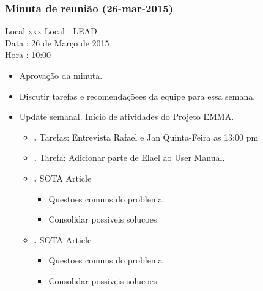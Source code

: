 \subsubsection{Minuta de reunião (26-mar-2015)}

\begin{tabbing}
  Local \= xxx \kill
  Local \> : LEAD \\
  Data  \> : 26 de Março de 2015 \\
  Hora  \> : 10:00
\end{tabbing}


\begin{itemize}
  \item Aprovação da minuta.

  \item Discutir tarefas e recomendaçõees da equipe para essa semana.


  \item Update semanal. Início de atividades do Projeto EMMA.
  \begin{itemize}

    \item \textbf{\alana.} Tarefas: Entrevista Rafael e Jan Quinta-Feira as 13:00 pm 
    
    \item \textbf{\renan.} Tarefa: Adicionar parte de Elael ao User Manual.
    \item \textbf{\elael.} SOTA Article
    		\begin{itemize}    
			 \item Questoes comuns do problema
			 \item Consolidar possiveis solucoes 
    		\end{itemize}
    \item \textbf{\gabriel.} SOTA Article
    		\begin{itemize}    
			 \item Questoes comuns do problema
			 \item Consolidar possiveis solucoes 
			\end{itemize}
  \end{itemize}



\end{itemize}
